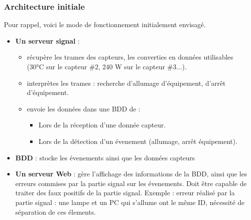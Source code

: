 \documentclass[10pt,a4paper]{article}
\begin{document}
\subsubsection{Architecture initiale}
Pour rappel, voici le mode de fonctionnement initialement envisagé.
\begin{itemize}
  \item \textbf{Un serveur signal} :
  \begin{itemize}
    \item récupère les trames des capteurs, les converties en données utilisables (30°C sur le capteur \#2, 240 W sur le capteur \#3...).
    \item interprètes les trames : recherche d'allumage d'équipement, d'arrêt d'équipement.
    \item envoie les données dans une BDD de :
    \begin{itemize}
      \item Lors de la réception d'une donnée capteur.
      \item Lors de la détection d'un évenement (allumage, arrêt équipement).
    \end{itemize}
  \end{itemize}
  \item \textbf{BDD} : stocke les évenements ainsi que les données capteurs
  \item \textbf{Un serveur Web} : gère l'affichage des informations de la BDD, ainsi que les erreurs commises par la partie signal sur les évenements. Doit être capable de traiter des faux positifs de la partie signal. Exemple : erreur réalisé par la partie signal : une lampe et un PC qui s'allume ont le même ID, nécessité de séparation de ces élements.
\end{itemize}
\end{document}

